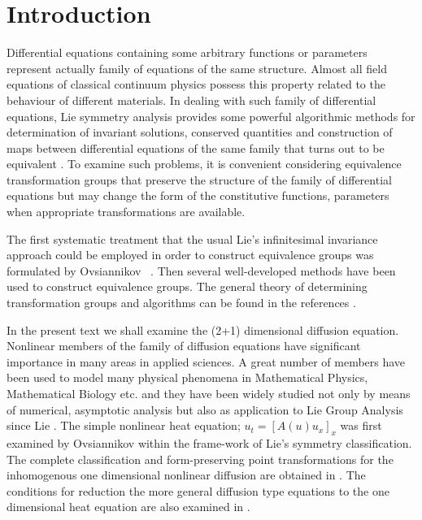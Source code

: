 \documentclass[a4paper]{article}
\begin{document}
\section{Introduction}
Differential equations containing some arbitrary functions or
parameters represent actually  family of equations of the same
structure. Almost all field equations of classical continuum physics
possess this property related to the behaviour of
different materials.  In dealing with such family of differential
equations, Lie symmetry analysis provides some powerful algorithmic
methods for determination of invariant solutions, conserved
quantities and construction of maps between
differential equations of the same family that turns out to be
equivalent \cite{csuhubi2005explicit,oliveri2012equivalence,ozer2003equivalence}.
 To examine such problems, it is convenient considering equivalence transformation groups that preserve
 the structure of the family of differential equations but may change the form of the constitutive functions, parameters
 when appropriate transformations are available.\par
 The first systematic treatment that the usual Lie's infinitesimal invariance approach could be
employed in order to construct equivalence groups was formulated by
Ovsiannikov ~\cite{ovsiannikov2014group}. Then several well-developed methods have been used to construct equivalence groups. The general theory of determining
transformation groups and algorithms  can be found in the references
\cite{ovsiannikov2014group,olver2000applications,
ibragimov1999elementary,suhubi2013exterior}.
\par In the present text we shall examine the (2+1) dimensional diffusion equation. Nonlinear members of the family of diffusion equations have significant importance in many areas in applied sciences. A great number of members  have been
used to model many physical phenomena in Mathematical Physics, Mathematical Biology etc. and  they have been widely studied not only by means of numerical, asymptotic analysis but also
as application to Lie Group Analysis since
Lie \cite{lie1897uber}. 
The simple nonlinear
heat equation; $u_t=[A(u)u_x]_x$ was first examined by Ovsiannikov
\cite{ovsiannikov1959group} within the frame-work of Lie's symmetry classification. The complete classification  and form-preserving point transformations for the inhomogenous one dimensional nonlinear diffusion are obtained in \cite{sophocleous2003symmetries}. The conditions for reduction the more general diffusion type equations to  the one dimensional  heat equation are also examined in \cite{johnpillai2001singular}. 
\end{document}
